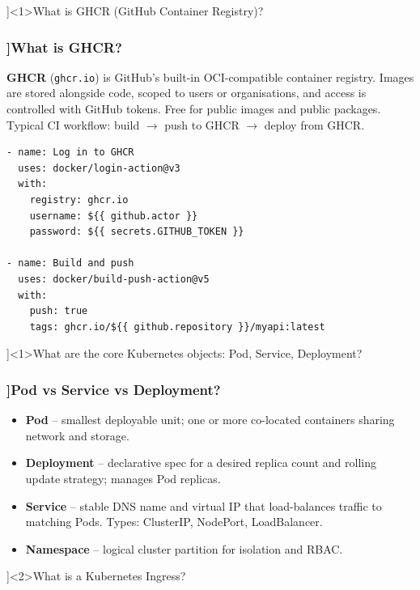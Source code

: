 \QuestionSlide[\CategoryBadge[DockerColor!20]{Docker \& K8s}]<1>{What is GHCR (GitHub Container Registry)?}

\begin{frame}[fragile]
  \frametitle{\AnswerTitle[\CategoryBadge[DockerColor!20]{Docker \& K8s}]{What is GHCR?}}

  {\footnotesize
  \textbf{GHCR} (\texttt{ghcr.io}) is GitHub's built-in OCI-compatible container registry. Images are stored alongside code, scoped to users or organisations, and access is controlled with GitHub tokens. Free for public images and public packages. Typical CI workflow: build $\to$ push to GHCR $\to$ deploy from GHCR.
  }

  \begin{verbatim}
- name: Log in to GHCR
  uses: docker/login-action@v3
  with:
    registry: ghcr.io
    username: ${{ github.actor }}
    password: ${{ secrets.GITHUB_TOKEN }}

- name: Build and push
  uses: docker/build-push-action@v5
  with:
    push: true
    tags: ghcr.io/${{ github.repository }}/myapi:latest
  \end{verbatim}
\end{frame}

\QuestionSlide[\CategoryBadge[DockerColor!20]{Docker \& K8s}]<1>{What are the core Kubernetes objects: Pod, Service, Deployment?}

\begin{frame}[fragile]
  \frametitle{\AnswerTitle[\CategoryBadge[DockerColor!20]{Docker \& K8s}]{Pod vs Service vs Deployment?}}

  {\footnotesize
  \begin{itemize}
    \item \textbf{Pod} – smallest deployable unit; one or more co-located containers sharing network and storage.
    \item \textbf{Deployment} – declarative spec for a desired replica count and rolling update strategy; manages Pod replicas.
    \item \textbf{Service} – stable DNS name and virtual IP that load-balances traffic to matching Pods. Types: ClusterIP, NodePort, LoadBalancer.
    \item \textbf{Namespace} – logical cluster partition for isolation and RBAC.
  \end{itemize}
  }
\end{frame}

\QuestionSlide[\CategoryBadge[DockerColor!20]{Docker \& K8s}]<2>{What is a Kubernetes Ingress?}

